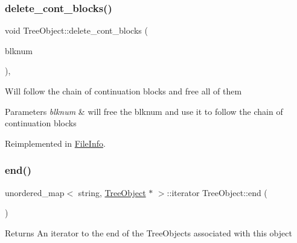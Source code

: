 \mbox{\label{classTreeObject_a07f5f5de1cff0cfdc2372e81559f5181}} 
\subsubsection{\texorpdfstring{delete\+\_\+cont\+\_\+blocks()}{delete\_cont\_blocks()}}
{\footnotesize\ttfamily void Tree\+Object\+::delete\+\_\+cont\+\_\+blocks (\begin{DoxyParamCaption}\item[{Blk\+Num\+Type}]{blknum }\end{DoxyParamCaption})\hspace{0.3cm}{\ttfamily [protected]}, {\ttfamily [virtual]}}

Will follow the chain of continuation blocks and free all of them 
\begin{DoxyParams}{Parameters}
{\em blknum} & will free the blknum and use it to follow the chain of continuation blocks \\
\hline
\end{DoxyParams}


Reimplemented in \mbox{\hyperlink{classFileInfo_a8c6b58cb9f7e9978064291ef81380e01}{File\+Info}}.

\mbox{\label{classTreeObject_a2544e2976f3b75cd1f0230f5f908059c}} 
\subsubsection{\texorpdfstring{end()}{end()}}
{\footnotesize\ttfamily unordered\+\_\+map$<$ string, \mbox{\hyperlink{classTreeObject}{Tree\+Object}} $\ast$ $>$\+::iterator Tree\+Object\+::end (\begin{DoxyParamCaption}{ }\end{DoxyParamCaption})}

\begin{DoxyReturn}{Returns}
An iterator to the end of the Tree\+Objects associated with this object 
\end{DoxyReturn}
\mbox{\label{classTreeObject_a453b5df2a9ef7c6faad259900d574ee2}} 
